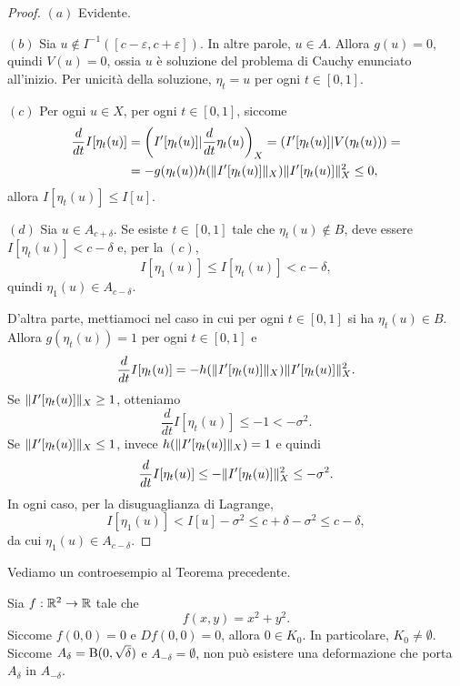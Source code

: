 \begin{proof}
	\par\noindent
	$(a)$ Evidente.
	\par\noindent
	$(b)$ Sia $u \notin I^{-1}(\left[ c-\varepsilon,c+\varepsilon\right] ).$ In altre parole, $u \in A$. Allora $g(u) = 0$, quindi $V(u)=0$, ossia $u$ è soluzione del problema di Cauchy enunciato all'inizio. Per unicità della soluzione, $\eta_t = u$ per ogni $t \in [0,1]$.
	\par\noindent
	$(c)$ Per ogni $u \in X$, per ogni $t \in [0,1]$, siccome
	\begin{align*}
		\frac{d}{dt}I[\eta_t(u)] &= \left( I'[\eta_t(u)] | \frac{d}{dt}\eta_t(u)\right)_X = (I'[\eta_t(u)]| V(\eta_t(u)))= \\
		&= -g(\eta_t(u))h(\lVert I'[\eta_t(u)]\rVert_X)\lVert I'[\eta_t(u)]\rVert_X^2 \le 0,
	\end{align*}
	allora $I[\eta_t(u)] \le I[u]$.
	\par\noindent
	$(d)$ Sia $u \in A_{c+\delta}$. Se esiste $t \in [0,1]$ tale che $\eta_t(u) \notin B$, deve essere $I[\eta_t(u)]< c-\delta$ e, per la $(c)$,
	\[ I[\eta_1(u)] \le I[\eta_t(u)]< c-\delta, \]
	quindi $\eta_1(u) \in A_{c-\delta}$.
	
	D'altra parte, mettiamoci nel caso in cui per ogni $t \in [0,1]$ si ha $\eta_t(u) \in B$. Allora $g(\eta_t(u)) = 1$ per ogni $t \in [0,1]$ e 
	\[ \frac{d}{dt}I[\eta_t(u)]  =-h(\lVert I'[\eta_t(u)]\rVert_X)\lVert I'[\eta_t(u)]\rVert_X^2. \]
	Se $\lVert I'[\eta_t(u)]\rVert_X \ge 1$, otteniamo 
	\[ \frac{d}{dt}I[\eta_t(u)] \le -1 < -\sigma^2. \]
	Se $\lVert I'[\eta_t(u)]\rVert_X \le 1$, invece $h(\lVert I'[\eta_t(u)]\rVert_X) = 1$ e quindi
	\[ \frac{d}{dt}I[\eta_t(u)] \le -\lVert I'[\eta_t(u)]\rVert_X^2 \le -\sigma^2. \]
	In ogni caso, per la disuguaglianza di Lagrange,
	\[ I[\eta_1(u)] < I[u] - \sigma^2 \le c+\delta - \sigma^2 \le c-\delta, \]
	da cui $\eta_1(u) \in A_{c-\delta}$.
\end{proof}

Vediamo un controesempio al Teorema precedente.
\begin{esempio}
	Sia $f: \mathbb{R}^2 \to \mathbb{R}$ tale che 
	\[ f(x,y) = x^2+y^2. \]
	Siccome $f(0,0) = 0$ e $Df(0,0) =0$, allora $0 \in K_0$. In particolare, $K_0 \ne \emptyset$. Siccome $A_\delta = \textup{B}(0,\sqrt{\delta})$ e $A_{-\delta} = \emptyset$, non può esistere una deformazione che porta $A_\delta$ in $A_{-\delta}$.
\end{esempio}

